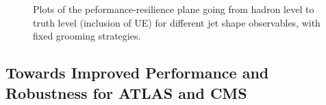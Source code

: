 \documentclass[11pt,letterpaper]{article}
\begin{document}
\begin{figure}
  \caption{Plots of the peformance-resilience plane going from hadron level to truth level (inclusion of UE) for different jet shape observables, with fixed grooming strategies.}\label{fig:shapes-UE}
\end{figure}







\subsection{Towards Improved Performance and Robustness for ATLAS and CMS}\label{sec:exp_compare}

\end{document}
